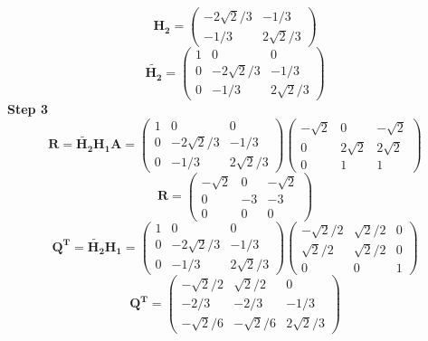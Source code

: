 \documentclass{article} %
\begin{document}
\begin{equation}
\boldsymbol{H_2} = \begin{pmatrix} -2\sqrt{2}/3 & -1/3 \\ -1/3 & 2\sqrt{2}/3 \end{pmatrix}
\end{equation}
\begin{equation}
\tilde{\boldsymbol{H_2}} = \begin{pmatrix} 1 & 0 & 0 \\ 0 & -2\sqrt{2}/3 & -1/3 \\ 0 & -1/3 & 2\sqrt{2}/3 \end{pmatrix}
\end{equation}
\textbf{Step 3} \\
\begin{equation}
\boldsymbol{R} = \tilde{\boldsymbol{H_2}} \boldsymbol{H_1} \boldsymbol{A} = \begin{pmatrix} 1 & 0 & 0 \\ 0 & -2\sqrt{2}/3 & -1/3 \\ 0 & -1/3 & 2\sqrt{2}/3 \end{pmatrix} \begin{pmatrix} -\sqrt{2} & 0 & -\sqrt{2} \\
 0 & 2\sqrt{2} & 2\sqrt{2}  \\
  0 & 1 & 1 \end{pmatrix} 
\end{equation}
\begin{equation}
\boldsymbol{R} = \begin{pmatrix} -\sqrt{2} & 0 & -\sqrt{2} \\ 0 & -3 & -3 \\ 0 & 0 & 0 \end{pmatrix}
\end{equation}
\begin{equation}
\boldsymbol{Q^T} = \tilde{\boldsymbol{H_2}} \boldsymbol{H_1} = \begin{pmatrix} 1 & 0 & 0 \\ 0 & -2\sqrt{2}/3 & -1/3 \\ 0 & -1/3 & 2\sqrt{2}/3 \end{pmatrix} \begin{pmatrix} -\sqrt{2}/2 & \sqrt{2}/2 & 0 \\ \sqrt{2}/2 & \sqrt{2}/2 & 0 \\ 0 & 0 & 1 \end{pmatrix} 
\end{equation}
\begin{equation}
\boldsymbol{Q^T} = \begin{pmatrix} -\sqrt{2}/2 & \sqrt{2}/2 & 0 \\ -2/3 & -2/3 & -1/3 \\ -\sqrt{2}/6 & -\sqrt{2}/6 & 2\sqrt{2}/3 \end{pmatrix} 
\end{equation}
\end{document}
